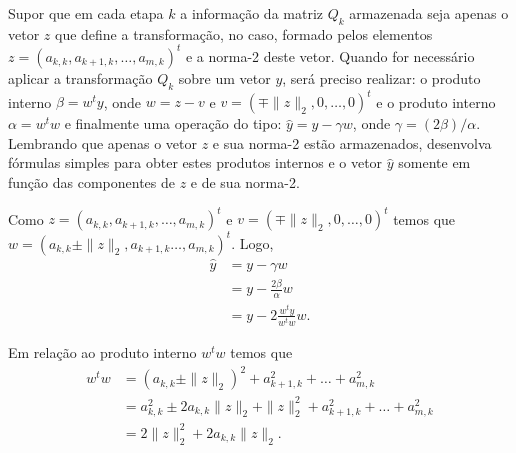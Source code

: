 \documentclass[a4paper,12pt, leqno, answers]{exam}
\begin{document}
\begin{questions}

    \question Supor que em cada etapa $k$ a informa\c{c}\~{a}o da matriz $Q_k$ armazenada seja apenas o vetor $z$ que define a transforma\c{c}\~{a}o, no caso, formado pelos elementos $z = \left( a_{k, k}, a_{k + 1, k}, \ldots, a_{m, k} \right)^t$ e a norma-2 deste vetor. Quando for necess\'{a}rio aplicar a transforma\c{c}\~{a}o $Q_k$ sobre um vetor $y$, ser\'{a} preciso realizar: o produto interno $\beta = w^t y$, onde $w = z - v$ e $v = \left( \mp \| z \|_2, 0, \ldots, 0 \right)^t$ e o produto interno $\alpha = w^t w$ e finalmente uma opera\c{c}\~{a}o do tipo: $\hat{y} = y - \gamma w$, onde $\gamma = \left( 2 \beta \right) / \alpha$. Lembrando que apenas o vetor $z$ e sua norma-2 est\~{a}o armazenados, desenvolva f\'{o}rmulas simples para obter estes produtos internos e o vetor $\hat{y}$ somente em fun\c{c}\~{a}o das componentes de $z$ e de sua norma-2.
    \begin{solution}
        Como $z = \left( a_{k, k}, a_{k + 1, k}, \ldots, a_{m, k} \right)^t$ e $v = \left( \mp \| z \|_2, 0, \ldots, 0 \right)^t$ temos que $w = \left( a_{k, k} \pm \| z \|_2, a_{k + 1, k} \ldots, a_{m, k}  \right)^t$. Logo,
        \begin{align*}
            \hat{y} &= y - \gamma w \\
            &= y - \frac{2 \beta}{\alpha} w \\
            &= y - 2 \frac{w^t y}{w^t w} w.
        \end{align*}

        Em rela\c{c}\~{a}o ao produto interno $w^t w$ temos que
        \begin{align*}
            w^t w &= \left( a_{k, k} \pm \| z \|_2 \right)^2 + a_{k + 1, k}^2 + \ldots + a_{m, k}^2 \\
            &= a_{k, k}^2 \pm 2 a_{k, k} \| z \|_2 + \| z \|_2^2 + a_{k + 1, k}^2 + \ldots + a_{m, k}^2 \\
            &= 2 \| z \|_2^2 + 2 a_{k, k} \| z \|_2.
        \end{align*}
    \end{solution}


\end{questions}
\end{document}
